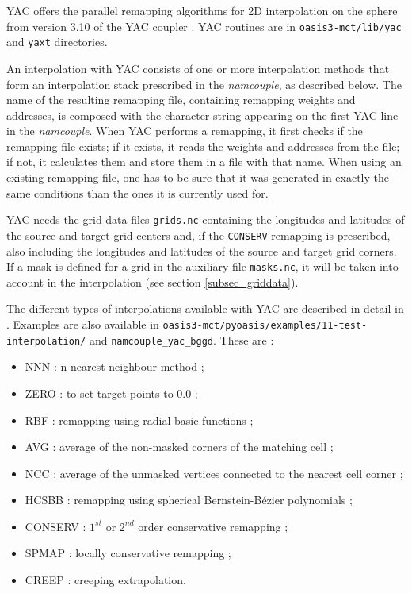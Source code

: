 YAC offers the parallel remapping algorithms for 2D interpolation on the sphere from version 3.10 of the YAC coupler \citep{hanke2016} \citep{hanke2019}  \cite{jonville2024}. YAC routines are in {\tt oasis3-mct/lib/yac} and {\tt yaxt} directories.

An interpolation with YAC consists of one or more interpolation methods that form an interpolation stack prescribed in the {\it namcouple}, as described below. The name of the resulting remapping file, containing remapping weights and addresses, is composed with the character string appearing on the first YAC line in the {\it namcouple}. When YAC performs a remapping, it first checks if the remapping file exists; if it exists, it reads the weights and addresses from the file; if not, it calculates them and store them in a file with that name. When using an existing remapping file, one has to be sure that it was generated in exactly the same conditions than the ones it is currently used for.

YAC needs the grid data files {\tt grids.nc} containing the longitudes and latitudes of the source and target grid centers and, if the {\tt CONSERV} remapping is prescribed, also including the longitudes and latitudes of the source and target grid corners.  If a mask is defined for a grid in the auxiliary
file {\tt masks.nc}, it will be taken into account in the interpolation (see section \ref{subsec_griddata}). 
 
The different types of interpolations available with YAC are described in detail in \cite{jonville2024}. Examples are also available in {\tt oasis3-mct/pyoasis/examples/11-test-interpolation/}  and {\tt namcouple\_yac\_bggd}. These are :
\begin{itemize}
\item NNN : n-nearest-neighbour method ;
\item ZERO : to set target points to 0.0 ;
\item RBF : remapping using radial basic functions ;
\item AVG : average of the non-masked corners of the matching cell ;
\item NCC : average of the unmasked vertices connected to the nearest cell corner ;
\item HCSBB : remapping using spherical Bernstein-B\'ezier polynomials ;
\item CONSERV : $1^{st}$ or $2^{nd}$ order conservative remapping ;
\item SPMAP :  locally conservative remapping ;
\item CREEP :  creeping extrapolation.
\end{itemize}

